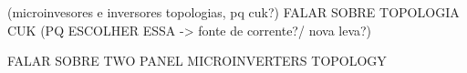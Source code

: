 \documentclass[
	12pt,				%
	openright,			%
	onseside,
	a4paper,			%
	english,			%
	french,				%
	spanish,			%
	brazil,				%
	]{abntex2}
\begin{document}
(microinvesores e inversores topologias, pq cuk?)
FALAR SOBRE TOPOLOGIA CUK (PQ ESCOLHER ESSA -> fonte de corrente?/ nova leva?)


	FALAR SOBRE TWO PANEL MICROINVERTERS TOPOLOGY




\end{document}
